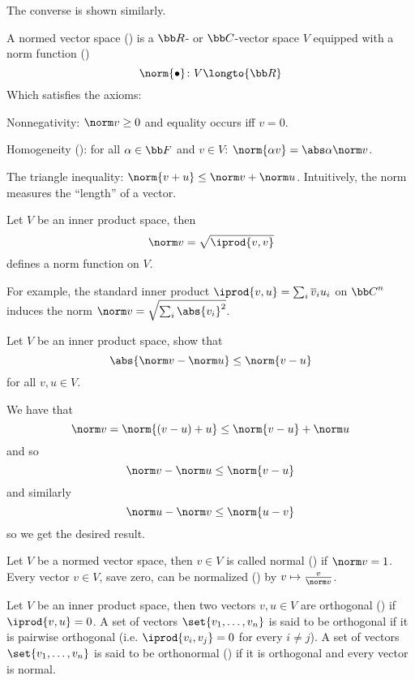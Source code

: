 The converse is shown similarly.
\qqed

\bdefn

    A {\emphcolor normed vector space} () is a ${\bb R}$- or ${\bb C}$-vector space $V$ equipped with a {\emphcolor norm function} ()
    $$ \norm{\bullet}\colon V\longto {\bb R} $$
    Which satisfies the axioms:
    \benum
        \item Nonnegativity: $\norm v\geq0$ and equality occurs iff $v=0$.
        \item Homogeneity (): for all $\alpha\in{\bb F}$ and $v\in V$: $\norm{\alpha v}=\abs\alpha\norm v$.
        \item The triangle inequality: $\norm{v+u}\leq\norm v+\norm u$.
    \eenum
    Intuitively, the norm measures the ``length'' of a vector.

\edefn

\bthrm

    Let $V$ be an inner product space, then
    $$ \norm v = \sqrt{\iprod{v,v}} $$
    defines a norm function on $V$.

\ethrm

For example, the standard inner product $\iprod{v,u}=\sum_i\overline v_iu_i$ on ${\bb C}^n$ induces the norm $\norm v=\sqrt{\sum_i\abs{v_i}^2}$.

\bexerc

    Let $V$ be an inner product space, show that
    $$ \abs{\norm v-\norm u} \leq \norm{v-u} $$
    for all $v,u\in V$.

\eexerc

We have that
$$ \norm v = \norm{(v-u)+u} \leq \norm{v-u} + \norm u $$
and so
$$ \norm v - \norm u \leq \norm{v-u} $$
and similarly
$$ \norm u - \norm v \leq \norm{u-v} $$
so we get the desired result.
\qqed

\bdefn

    Let $V$ be a normed vector space, then $v\in V$ is called {\emphcolor normal} () if $\norm v=1$.
    Every vector $v\in V$, save zero, can be {\emphcolor normalized} () by $v\mapsto\frac{v}{\norm v}$.

\edefn

\bdefn

    Let $V$ be an inner product space, then two vectors $v,u\in V$ are {\emphcolor orthogonal} () if $\iprod{v,u}=0$.
    A set of vectors $\set{v_1,\dots,v_n}$ is said to be orthogonal if it is pairwise orthogonal (i.e. $\iprod{v_i,v_j}=0$ for every $i\neq j$).
    A set of vectors $\set{v_1,\dots,v_n}$ is said to be {\emphcolor orthonormal} () if it is orthogonal and every vector is normal.

